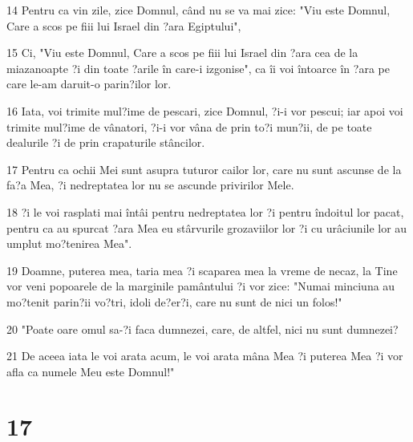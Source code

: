 \par 14 Pentru ca vin zile, zice Domnul, când nu se va mai zice: "Viu este Domnul, Care a scos pe fiii lui Israel din ?ara Egiptului",
\par 15 Ci, "Viu este Domnul, Care a scos pe fiii lui Israel din ?ara cea de la miazanoapte ?i din toate ?arile în care-i izgonise", ca îi voi întoarce în ?ara pe care le-am daruit-o parin?ilor lor.
\par 16 Iata, voi trimite mul?ime de pescari, zice Domnul, ?i-i vor pescui; iar apoi voi trimite mul?ime de vânatori, ?i-i vor vâna de prin to?i mun?ii, de pe toate dealurile ?i de prin crapaturile stâncilor.
\par 17 Pentru ca ochii Mei sunt asupra tuturor cailor lor, care nu sunt ascunse de la fa?a Mea, ?i nedreptatea lor nu se ascunde privirilor Mele.
\par 18 ?i le voi rasplati mai întâi pentru nedreptatea lor ?i pentru îndoitul lor pacat, pentru ca au spurcat ?ara Mea eu stârvurile grozaviilor lor ?i cu urâciunile lor au umplut mo?tenirea Mea".
\par 19 Doamne, puterea mea, taria mea ?i scaparea mea la vreme de necaz, la Tine vor veni popoarele de la marginile pamântului ?i vor zice: "Numai minciuna au mo?tenit parin?ii vo?tri, idoli de?er?i, care nu sunt de nici un folos!"
\par 20 "Poate oare omul sa-?i faca dumnezei, care, de altfel, nici nu sunt dumnezei?
\par 21 De aceea iata le voi arata acum, le voi arata mâna Mea ?i puterea Mea ?i vor afla ca numele Meu este Domnul!"

\chapter{17}

